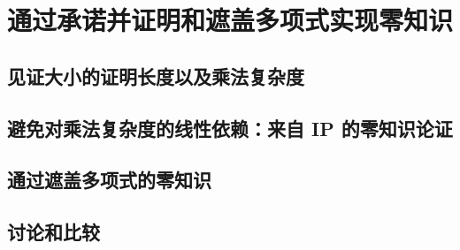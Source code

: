 \chapter{通过承诺并证明和遮盖多项式实现零知识}\label{chp:13CP}

\section{见证大小的证明长度以及乘法复杂度}\label{13.1}
\section{避免对乘法复杂度的线性依赖：来自 IP 的零知识论证}\label{13.2}
\section{通过遮盖多项式的零知识}\label{13.3}
\section{讨论和比较}\label{13.4}